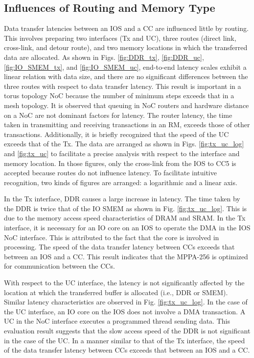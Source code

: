 \subsection{Influences of Routing and Memory Type}
\label{sec:routing_and_memory}

Data transfer latencies between an IOS and a CC are influenced little by routing.
This involves preparing two interfaces (Tx and UC), three routes (direct link, cross-link, and detour route), and two memory locations in which the transferred data are allocated.
As shown in Figs. \ref{fig:DDR_tx}, \ref{fig:DDR_uc}, \ref{fig:IO_SMEM_tx}, and \ref{fig:IO_SMEM_uc}, 
end-to-end latency scales exhibit a linear relation with data size, and there are no significant differences between the three routes with respect to data transfer latency.
This result is important in a torus topology NoC because the number of minimum steps exceeds that in a mesh topology. 
It is observed that queuing in NoC routers and hardware distance on a NoC are not dominant factors for latency.
The router latency, the time taken in transmitting and receiving transactions in an RM, exceeds those of other transactions.
Additionally, it is briefly recognized that the speed of the UC exceeds that of the Tx.
The data are arranged as shown in Figs. \ref{fig:tx_uc_log} and \ref{fig:tx_uc} to facilitate a precise analysis with respect to the interface and memory location.
In those figures, only the cross-link from the IOS to CC5 is accepted because routes do not influence latency.
To facilitate intuitive recognition, two kinds of figures are arranged: a logarithmic and a linear axis.

In the Tx interface, DDR causes a large increase in latency.
The time taken by the DDR is twice that of the IO SMEM as shown in Fig. \ref{fig:tx_uc_log}.
This is due to the memory access speed characteristics of DRAM and SRAM.
In the Tx interface, it is necessary for an IO core on an IOS to operate the DMA in the IOS NoC interface.
This is attributed to the fact that the core is involved in processing.
The speed of the data transfer latency between CCs exceeds that between an IOS and a CC.
This result indicates that the MPPA-256 is optimized for communication between the CCs.

With respect to the UC interface, the latency is not significantly affected by the location at which the transferred buffer is allocated (i.e., DDR or SMEM).
Similar latency characteristics are observed in Fig. \ref{fig:tx_uc_log}.
In the case of the UC interface, an IO core on the IOS does not involve a DMA transaction.
A UC in the NoC interface executes a programmed thread sending data.
This evaluation result suggests that the slow access speed of the DDR is not significant in the case of the UC.
In a manner similar to that of the Tx interface, the speed of the data transfer latency between CCs exceeds that between an IOS and a CC.

